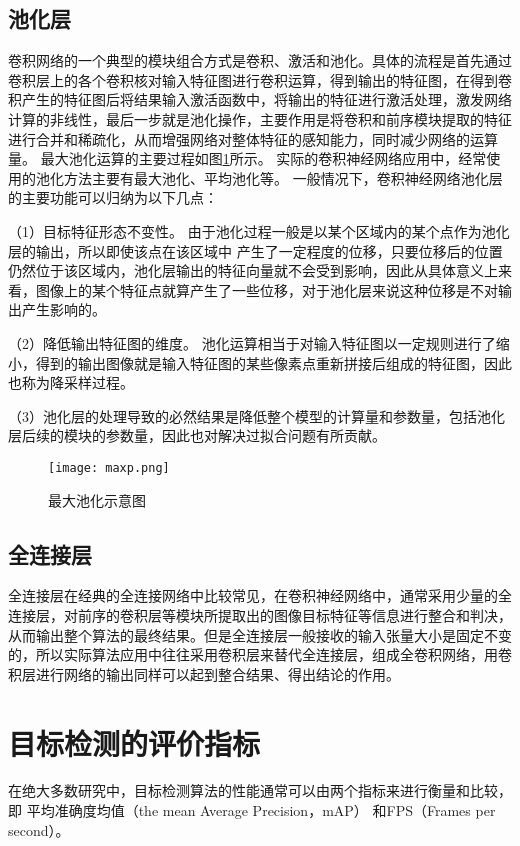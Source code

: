 \subsection{池化层}
卷积网络的一个典型的模块组合方式是卷积、激活和池化。具体的流程是首先通过卷积层上的各个卷积核对输入特征图进行卷积运算，得到输出的特征图，在得到卷积产生的特征图后将结果输入激活函数中，将输出的特征进行激活处理，激发网络计算的非线性，最后一步就是池化操作，主要作用是将卷积和前序模块提取的特征进行合并和稀疏化，从而增强网络对整体特征的感知能力，同时减少网络的运算量。
最大池化运算的主要过程如图\ref{maxp}所示。
实际的卷积神经网络应用中，经常使用的池化方法主要有最大池化、平均池化等。
一般情况下，卷积神经网络池化层的主要功能可以归纳为以下几点：

（1）目标特征形态不变性。
由于池化过程一般是以某个区域内的某个点作为池化层的输出，所以即使该点在该区域中
产生了一定程度的位移，只要位移后的位置仍然位于该区域内，池化层输出的特征向量就不会受到影响，因此从具体意义上来看，图像上的某个特征点就算产生了一些位移，对于池化层来说这种位移是不对输出产生影响的。

（2）降低输出特征图的维度。
池化运算相当于对输入特征图以一定规则进行了缩小，得到的输出图像就是输入特征图的某些像素点重新拼接后组成的特征图，因此也称为降采样过程。

（3）池化层的处理导致的必然结果是降低整个模型的计算量和参数量，包括池化层后续的模块的参数量，因此也对解决过拟合问题有所贡献\cite{gu2018recent}。

\begin{figure}[htbp]
    \centering
    \texttt{[image: maxp.png]}
    \caption{最大池化示意图}
    \label{maxp}
\end{figure}

\subsection{全连接层}
全连接层在经典的全连接网络中比较常见，在卷积神经网络中，通常采用少量的全连接层，对前序的卷积层等模块所提取出的图像目标特征等信息进行整合和判决，从而输出整个算法的最终结果。但是全连接层一般接收的输入张量大小是固定不变的，所以实际算法应用中往往采用卷积层来替代全连接层，组成全卷积网络，用卷积层进行网络的输出同样可以起到整合结果、得出结论的作用。

\section{目标检测的评价指标}
在绝大多数研究中，目标检测算法的性能通常可以由两个指标来进行衡量和比较，即
平均准确度均值（the mean
Average Precision，mAP）
和FPS（Frames per second）。

